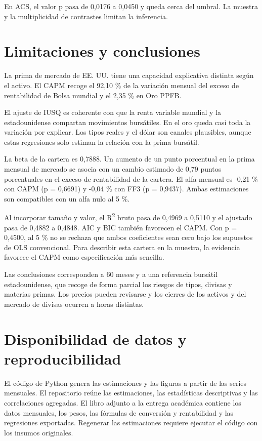 \documentclass[11pt,a4paper]{article}
\begin{document}
En ACS, el valor p pasa de 0,0176 a 0,0450 y queda cerca del umbral. La muestra y la multiplicidad de contrastes limitan la inferencia.

\section{Limitaciones y conclusiones}
La prima de mercado de EE. UU. tiene una capacidad explicativa distinta según el activo. El CAPM recoge el 92,10 \% de la variación mensual del exceso de rentabilidad de Bolsa mundial y el 2,35 \% en Oro PPFB.

El ajuste de IUSQ es coherente con que la renta variable mundial y la estadounidense compartan movimientos bursátiles. En el oro queda casi toda la variación por explicar. Los tipos reales y el dólar son canales plausibles, aunque estas regresiones solo estiman la relación con la prima bursátil.

La beta de la cartera es 0,7888. Un aumento de un punto porcentual en la prima mensual de mercado se asocia con un cambio estimado de 0,79 puntos porcentuales en el exceso de rentabilidad de la cartera. El alfa mensual es -0,21 \% con CAPM (p = 0,6691) y -0,04 \% con FF3 (p = 0,9437). Ambas estimaciones son compatibles con un alfa nulo al 5 \%.

Al incorporar tamaño y valor, el R\textsuperscript{2} bruto pasa de 0,4969 a 0,5110 y el ajustado pasa de 0,4882 a 0,4848. AIC y BIC también favorecen el CAPM. Con p = 0,4500, al 5 \% no se rechaza que ambos coeficientes sean cero bajo los supuestos de OLS convencional. Para describir esta cartera en la muestra, la evidencia favorece el CAPM como especificación más sencilla.

Las conclusiones corresponden a 60 meses y a una referencia bursátil estadounidense, que recoge de forma parcial los riesgos de tipos, divisas y materias primas. Los precios pueden revisarse y los cierres de los activos y del mercado de divisas ocurren a horas distintas.

\section{Disponibilidad de datos y reproducibilidad}
El código de Python genera las estimaciones y las figuras a partir de las series mensuales. El repositorio reúne las estimaciones, las estadísticas descriptivas y las correlaciones agregadas. El libro adjunto a la entrega académica contiene los datos mensuales, los pesos, las fórmulas de conversión y rentabilidad y las regresiones exportadas. Regenerar las estimaciones requiere ejecutar el código con los insumos originales.
\end{document}
